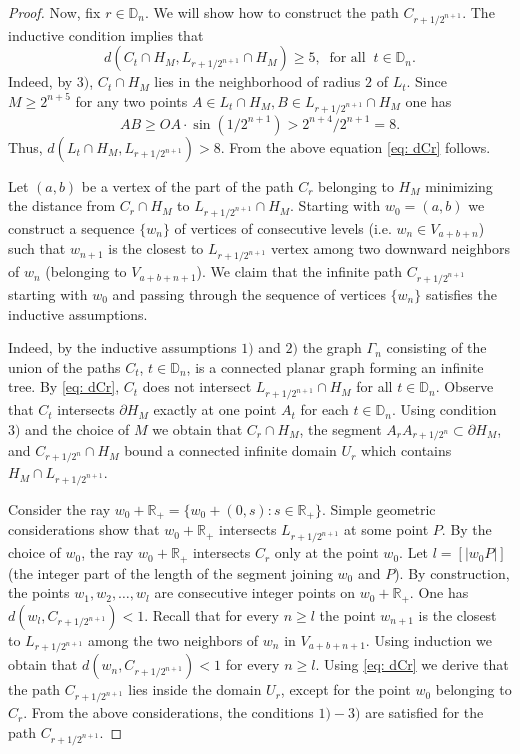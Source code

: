 \documentclass[11pt, twoside]{amsart}
\theoremstyle{definition}
\theoremstyle{remark}
\theoremstyle{plain}
\numberwithin{equation}{section}
\begin{document}
\begin{proof}
Now, fix $r\in\mathbb D_n$. We will show how to construct the path $C_{r+1/2^{n+1}}$. The inductive condition implies that \begin{equation}\label{eq: dCr} d(C_t\cap H_M,L_{r+1/2^{n+1}}\cap H_M)\geqslant 5,\;\;\text{for all}\;\;t\in\mathbb D_n.\end{equation} Indeed, by $3)$, $C_t\cap H_M$ lies in the neighborhood of radius $2$ of $L_t$. Since $M\geqslant 2^{n+5}$ for any two points $A\in L_t\cap H_M,B\in L_{r+1/2^{n+1}}\cap H_M$ one has 
$$AB\geqslant OA\cdot \sin(1/2^{n+1})>2^{n+4}/2^{n+1}=8.
$$ 
Thus, $d(L_t\cap H_M,L_{r+1/2^{n+1}})>8$. From the above equation \eqref{eq: dCr} follows. 
 
 
 Let $(a,b)$ be a vertex of the part of the path $C_r$ belonging to $H_M$ minimizing the distance from $C_r\cap H_M$ to $L_{r+1/2^{n+1}}\cap H_M$. Starting with $w_0=(a,b)$ we construct a sequence $\{w_n\}$ of vertices of consecutive levels (i.e. $w_n\in V_{a+b+n}$) such that $w_{n+1}$ is the closest to $L_{r+1/2^{n+1}}$ vertex among two downward neighbors of $w_n$ (belonging to $V_{a+b+n+1}$). We claim that the infinite path $C_{r+1/{2^{n+1}}}$ starting with $w_0$ and passing through the sequence of vertices $\{w_n\}$ satisfies the inductive assumptions.

 Indeed, by the inductive assumptions $1)$ and $2)$ the graph $\Gamma_n$ consisting of the union of the paths $C_t$, $t\in\mathbb D_n$, is a connected planar graph forming an infinite tree. By \eqref{eq: dCr}, $C_t$  does not intersect $L_{r+1/2^{n+1}}\cap H_M$ for all $t\in\mathbb D_n$. Observe that $C_t$ intersects $\partial H_M$ exactly at one point $A_t$ for each $t\in \mathbb D_n$.  Using condition $3)$ and the choice of $M$ we obtain that $C_r\cap H_M$, the segment $A_rA_{r+1/2^n}\subset\partial H_M$, and $C_{r+1/2^n}\cap H_M$ bound a connected infinite domain $U_r$ which contains $H_M\cap L_{r+1/2^{n+1}}$. 

 Consider the ray $w_0+\mathbb R_+=\{w_0+(0,s):s\in\mathbb R_+\}$. Simple geometric considerations show that $w_0+\mathbb R_+$ intersects $L_{r+1/2^{n+1}}$ at some point $P$. By the choice of $w_0$, the ray $w_0+\mathbb R_+$ intersects $C_r$ only at the point $w_0$. 
 Let $l=[|w_0P|]$ (the integer part of the length of the segment joining $w_0$ and $P$). By construction, the points $w_1,w_2,\ldots,w_l$ are consecutive integer points on $w_0+\mathbb R_+$. One has $d(w_l,C_{r+1/2^{n+1}})<1$. Recall that for every $n\geqslant l$ the point $w_{n+1}$ is the closest to $L_{r+1/2^{n+1}}$ among the two neighbors of $w_n$ in $V_{a+b+n+1}$. Using induction we obtain that $d(w_n,C_{r+1/2^{n+1}})<1$ for every $n\geqslant l$. Using \eqref{eq: dCr} we derive that the path $C_{r+1/2^{n+1}}$ lies inside the domain $U_r$, except for the point $w_0$ belonging to $C_r$. From the above considerations, the conditions $1)-3)$ are satisfied for the path $C_{r+1/2^{n+1}}$.


\end{proof}
\end{document}
